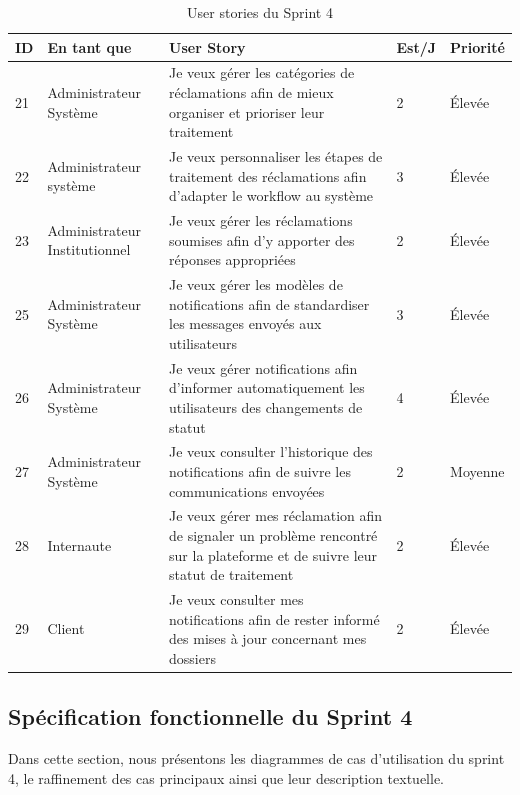 \begin{table}[H]
    \centering
    \begin{tabular}{ |p{1cm}|p{3cm}|p{7cm}|p{1cm}|p{2cm}|} \hline
    \rowcolor{orange!30}
    \textbf{ID} & \textbf{En tant que} & \textbf{User Story} & \textbf{Est/J} & \textbf{Priorité} \\ \hline

    21 & Administrateur Système & Je veux gérer les catégories de réclamations afin de mieux organiser et prioriser leur traitement & 2 & Élevée \\ \hline
    22 & Administrateur système & Je veux personnaliser les étapes de traitement des réclamations afin d'adapter le workflow au système & 3 & Élevée \\ \hline
    23 & Administrateur Institutionnel  & Je veux gérer les réclamations soumises afin d'y apporter des réponses appropriées & 2 & Élevée \\ \hline
    25 & Administrateur Système & Je veux gérer les modèles de notifications afin de standardiser les messages envoyés aux utilisateurs & 3 & Élevée \\ \hline
    26 & Administrateur Système & Je veux gérer notifications afin d'informer automatiquement les utilisateurs des changements de statut & 4 & Élevée \\ \hline
    27 & Administrateur Système & Je veux consulter l'historique des notifications afin de suivre les communications envoyées & 2 & Moyenne \\ \hline
    28 & Internaute & Je veux gérer mes réclamation afin de signaler un problème rencontré sur la plateforme et de suivre leur statut de traitement& 2 & Élevée \\ \hline
    29 & Client & Je veux consulter mes notifications afin de rester informé des mises à jour concernant mes dossiers & 2 & Élevée \\ \hline

    \end{tabular}
    \caption{User stories du Sprint 4}
    \label{tab:user-stories-sprint4}
\end{table}

\subsection{Spécification fonctionnelle du Sprint 4}
Dans cette section, nous présentons les diagrammes de cas d'utilisation du sprint 4, le raffinement des cas principaux ainsi que leur description textuelle.

